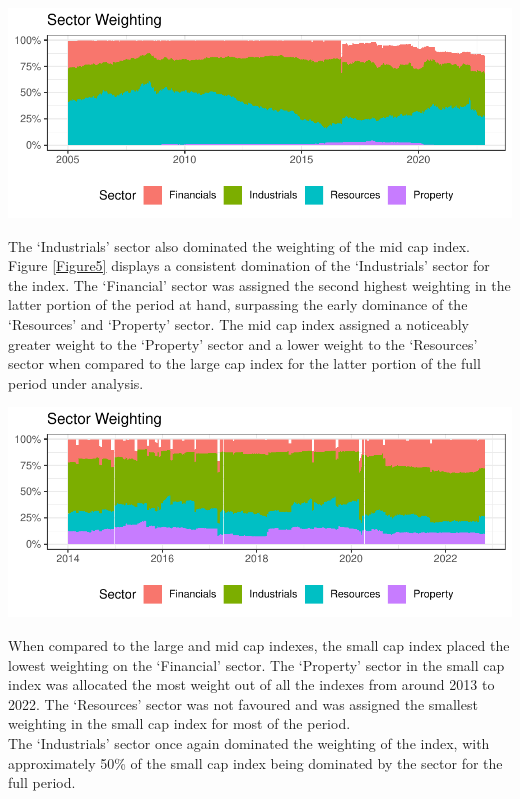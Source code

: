 \documentclass[11pt,preprint, authoryear]{elsarticle}
\let\origfigure\figure
\let\endorigfigure\endfigure
\renewenvironment{figure}[1][2] {
    \expandafter\origfigure\expandafter[H]
} {
    \endorigfigure
}
\numberwithin{equation}{section}
\numberwithin{figure}{section}
\numberwithin{table}{section}
\begin{document}
\begin{figure}[H]

{\centering \includegraphics{Volatility-of-Shares_files/figure-latex/Figure4-1} 

}

\caption{Sector weights for Large Cap index \label{Figure4}}\label{fig:Figure4}
\end{figure}

The `Industrials' sector also dominated the weighting of the mid cap
index. Figure \ref{Figure5} displays a consistent domination of the
`Industrials' sector for the index. The `Financial' sector was assigned
the second highest weighting in the latter portion of the period at
hand, surpassing the early dominance of the `Resources' and `Property'
sector. The mid cap index assigned a noticeably greater weight to the
`Property' sector and a lower weight to the `Resources' sector when
compared to the large cap index for the latter portion of the full
period under analysis.

\begin{figure}[H]

{\centering \includegraphics{Volatility-of-Shares_files/figure-latex/Figure5-1} 

}

\caption{Sector weights for Mid Cap index \label{Figure5}}\label{fig:Figure5}
\end{figure}

When compared to the large and mid cap indexes, the small cap index
placed the lowest weighting on the `Financial' sector. The `Property'
sector in the small cap index was allocated the most weight out of all
the indexes from around 2013 to 2022. The `Resources' sector was not
favoured and was assigned the smallest weighting in the small cap index
for most of the period.\\
The `Industrials' sector once again dominated the weighting of the
index, with approximately 50\% of the small cap index being dominated by
the sector for the full period.
\end{document}
